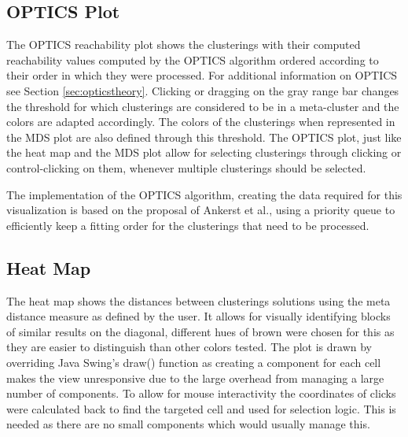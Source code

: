 \documentclass[
	a4paper,
	english,
	twoside,
	openright,               
	11pt                            
	]{report}
\begin{document}
\subsection{OPTICS Plot}
The OPTICS reachability plot shows the clusterings with their computed reachability values computed by the OPTICS algorithm ordered according to their order in which they were processed. For additional information on OPTICS see Section \ref{sec:opticstheory}. Clicking or dragging on the gray range bar changes the threshold for which clusterings are considered to be in a meta-cluster and the colors are adapted accordingly. The colors of the clusterings when represented in the MDS plot are also defined through this threshold. The OPTICS plot, just like the heat map and the MDS plot allow for selecting clusterings through clicking or control-clicking on them, whenever multiple clusterings should be selected.

The implementation of the OPTICS algorithm, creating the data required for this visualization is based on the proposal of Ankerst et al., using a priority queue to efficiently keep a fitting order for the clusterings that need to be processed.

\subsection{Heat Map}
The heat map shows the distances between clusterings solutions using the meta distance measure as defined by the user. It allows for visually identifying blocks of similar results on the diagonal, different hues of brown were chosen for this as they are easier to distinguish than other colors tested. The plot is drawn by overriding Java Swing's \cite{javaswing} draw() function as creating a component for each cell makes the view unresponsive due to the large overhead from managing a large number of components. To allow for mouse interactivity the coordinates of clicks were calculated back to find the targeted cell and used for selection logic. This is needed as there are no small components which would usually manage this.
\end{document}

